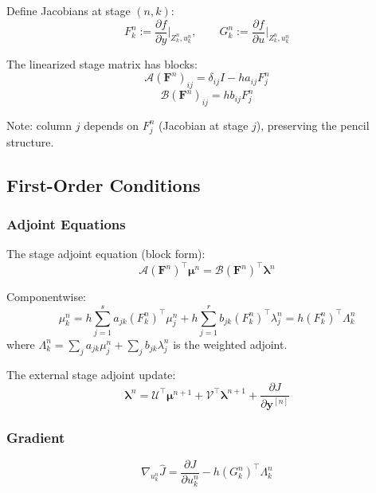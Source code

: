 \documentclass[11pt]{article}
\newcommand{\tp}{^\top}
\newcommand{\pder}[2]{\frac{\partial #1}{\partial #2}}
\newcommand{\yv}{\mathbf{y}}
\newcommand{\lv}{\boldsymbol{\lambda}}
\newcommand{\mv}{\boldsymbol{\mu}}
\newcommand{\Av}{\mathcal{A}}
\newcommand{\Bv}{\mathcal{B}}
\newcommand{\Uv}{\mathcal{U}}
\newcommand{\Vv}{\mathcal{V}}
\begin{document}
Define Jacobians at stage $(n,k)$:
\begin{equation}
F_k^n := \pder{f}{y}\bigg|_{Z_k^n, u_k^n}, \qquad G_k^n := \pder{f}{u}\bigg|_{Z_k^n, u_k^n}
\end{equation}

The linearized stage matrix has blocks:
\begin{equation}
\Av(\mathbf{F}^n)_{ij} = \delta_{ij}I - h a_{ij} F_j^n
\end{equation}
\begin{equation}
\Bv(\mathbf{F}^n)_{ij} = h b_{ij} F_j^n
\end{equation}

Note: column $j$ depends on $F_j^n$ (Jacobian at stage $j$), preserving the pencil structure.

\subsection{First-Order Conditions}

\subsubsection{Adjoint Equations}

The stage adjoint equation (block form):
\begin{equation}
\label{eqn:nl_glm_mu}
\boxed{\Av(\mathbf{F}^n)\tp \mv^n = \Bv(\mathbf{F}^n)\tp \lv^n}
\end{equation}

Componentwise: 
\begin{equation}
\mu_k^n = h\sum_{j=1}^s a_{jk} (F_k^n)\tp \mu_j^n + h\sum_{j=1}^r b_{jk} (F_k^n)\tp \lambda_j^n = h(F_k^n)\tp \Lambda_k^n
\end{equation}
where $\Lambda_k^n = \sum_j a_{jk}\mu_j^n + \sum_j b_{jk}\lambda_j^n$ is the weighted adjoint.

The external stage adjoint update:
\begin{equation}
\label{eqn:nl_glm_lambda}
\boxed{\lv^n = \Uv\tp \mv^{n+1} + \Vv\tp \lv^{n+1} + \pder{J}{\yv^{[n]}}}
\end{equation}

\subsubsection{Gradient}

\begin{equation}
\boxed{\nabla_{u_k^n}\hat{J} = \pder{J}{u_k^n} - h(G_k^n)\tp \Lambda_k^n}
\end{equation}
\end{document}
